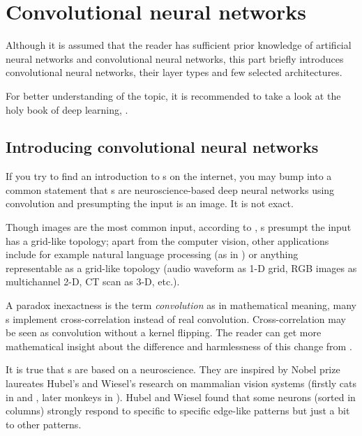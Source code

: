 \chapter{Convolutional neural networks}
\label{cnn}


Although it is assumed that the reader has sufficient prior knowledge of 
artificial neural networks and convolutional neural networks, this part briefly 
introduces convolutional neural networks, their layer types and few selected 
architectures. 

For better understanding of the topic, it is recommended to take a look at the 
holy book of deep learning, \cite{dl}.

\section{Introducing convolutional neural networks}
\label{understanding-cnn}

If you try to find an introduction to s on the internet, you may bump 
into a common statement that s are neuroscience-based deep neural 
networks using convolution and presumpting the input is an image. It is not 
exact. 

Though images are the most common input, according to \cite{dl}, s 
presumpt the input has a grid-like topology; apart from the computer vision, 
other applications include  for example natural language processing (as in 
\cite{cnn-nlp}) or anything representable as a grid-like topology (audio 
waveform as 1-D grid, RGB images as multichannel 2-D, CT scan as 3-D, etc.). 

A paradox inexactness is the term \textit{convolution} as in mathematical 
meaning, many s implement cross-correlation instead of real convolution. 
Cross-correlation may be seen as convolution without a kernel flipping. The 
reader can get more mathematical insight about the difference and harmlessness 
of this change from \cite{dl}. 

It is true that s are based on a neuroscience. They are inspired by 
Nobel prize laureates Hubel's and Wiesel's research on mammalian vision systems 
(firstly cats in \cite{hubel-cats1} and \cite{hubel-cats2}, later monkeys in 
\cite{hubel-monkeys}). Hubel and Wiesel found that some neurons (sorted in 
columns) strongly respond to specific to specific edge-like patterns but just a 
bit to other patterns. 

